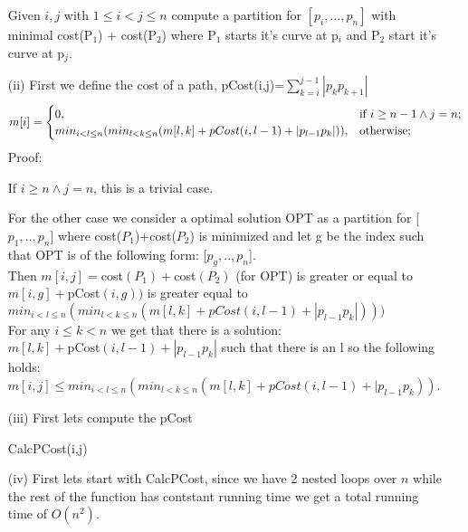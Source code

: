 \documentclass{article}
\newcounter{rcounter}
\newenvironment{rlist}%
{\begin{list}{A.2-\arabic{rcounter}}{\usecounter{rcounter}}}{\end{list}}
\begin{document}
\begin{rlist}
\begin{enumerate}
Given $i,j$ with $1 \le i < j \le n$ compute a partition for $[p_i,...,p_n]$ with minimal cost(P$_1$) + cost(P$_2$) where P$_1$ starts it’s curve at p$_i$ and P$_2$ start it’s curve at p$_j$.

      \item[(ii)] 
First we define the cost of a path, pCost(i,j)=$\sum_{k=i}^{j-1}|p_kp_{k+1}|$
\[
m[i]=
\begin{cases}
0, & $\text{if $i \ge n-1\wedge  j=n$;}$\\
min_{i < l \le n}(min_{l<k\le n}(m[l,k]+pCost(i,l-1)+|p_{l-1}p_k|)), & $\text{otherwise;}$
\end{cases}
\]
Proof:

If $i \ge n \wedge j=n$, this is a trivial case.

For the other case we consider a optimal solution OPT as a partition for [$p_1,..,p_n$] where cost($P_1$)+cost($P_2$) is minimized and let g be the index such that OPT is of the following form: [$p_g,..,p_n$].\\ Then $m[i,j]=$cost$(P_1)+$cost$(P_2)$ (for OPT) is greater or equal to $m[i,g]+$pCost$(i,g))$ is greater equal to $min_{i<l\le n}(min_{l<k\le n}(m[l,k]+pCost(i,l-1)+|p_{l-1}p_k|)))$\\

For any $i\le k < n $ we get that there is a solution: $m[l,k]+\text{pCost}(i,l-1)+|p_{l-1}p_k|$ such that there is an l so the following holds: $m[i,j]\le min_{i<l\le n}(min_{l<k\le n}(m[l,k]+pCost(i,l-1)+|p_{l-1}p_k))$.



      \item[(iii)] 
First lets compute the pCost
\begin{algorithmic}[1]
\STATE CalcPCost(i,j)
\ENDFOR
\ENDFOR
\end{algorithmic}
\bigskip

\begin{algorithmic}[1]
\ENDFOR
\ENDFOR
{}
\end{algorithmic}


      \item[(iv)] 
First lets start with CalcPCost, since we have 2 nested loops over $n$ while the rest of the function has contstant running time we get a total running time of $O(n^2)$.


\end{enumerate}
\end{rlist}
\end{document}
